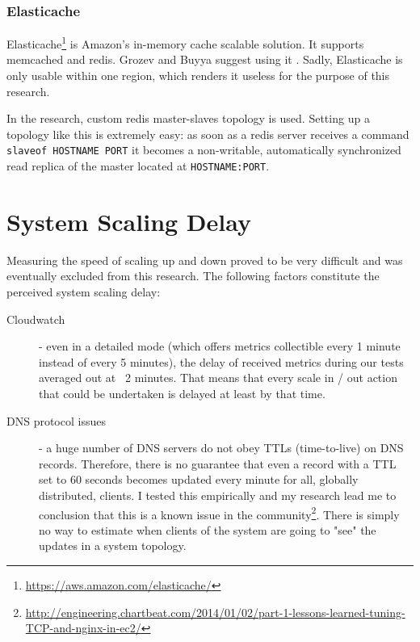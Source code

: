 \documentclass{uvamscse}
\begin{document}
\subsubsection{Elasticache}

Elasticache\footnote{\url{https://aws.amazon.com/elasticache/}} is Amazon’s in-memory cache scalable solution. It supports memcached and redis. Grozev and Buyya suggest using it \cite{GroBuy}. Sadly, Elasticache is only usable within one region, which renders it useless for the purpose of this research.

In the research, custom redis master-slaves topology is used. Setting up a topology like this is extremely easy: as soon as a redis server receives a command \texttt{slaveof HOSTNAME PORT} it becomes a non-writable, automatically synchronized read replica of the master located at \texttt{HOSTNAME:PORT}.

\section{System Scaling Delay}\label{System Scaling Delay}
Measuring the speed of scaling up and down proved to be very difficult and was eventually excluded from this research. The following factors constitute the perceived system scaling delay:
\begin{description}
  \item [Cloudwatch] - even in a detailed mode (which offers metrics collectible every 1 minute instead of every 5 minutes), the delay of received metrics during our tests averaged out at ~2 minutes. That means that every scale in / out action that could be undertaken is delayed at least by that time.
  \item [DNS protocol issues] - a huge number of DNS servers do not obey TTLs (time-to-live) on DNS records. Therefore, there is no guarantee that even a record with a TTL set to 60 seconds becomes updated every minute for all, globally distributed, clients. I tested this empirically and my research lead me to conclusion that this is a known issue in the community\footnote{\url{http://engineering.chartbeat.com/2014/01/02/part-1-lessons-learned-tuning-TCP-and-nginx-in-ec2/}}. There is simply no way to estimate when clients of the system are going to "see" the updates in a system topology.
\end{description}



\end{document}
